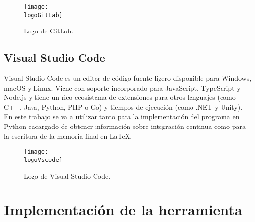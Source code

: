 \begin{figure}[h]
    \centering
    \texttt{[image: \\logoGitLab]}
    \caption{Logo de GitLab.}
\end{figure}

\subsection{Visual Studio Code}
Visual Studio Code es un editor de código fuente ligero disponible para Windows, macOS y Linux. Viene con soporte incorporado para JavaScript, TypeScript y Node.js y tiene un rico ecosistema de extensiones para otros lenguajes  (como C++, Java, Python, PHP o Go) y tiempos de ejecución (como .NET y Unity).
En este trabajo se va a utilizar tanto para la implementación del programa en Python encargado de obtener información sobre integración continua como para la escritura de la memoria final en LaTeX.

\begin{figure}[h]
    \centering
    \texttt{[image: \\logoVscode]}
    \caption{Logo de Visual Studio Code.}
\end{figure}

\section{Implementación de la herramienta}

